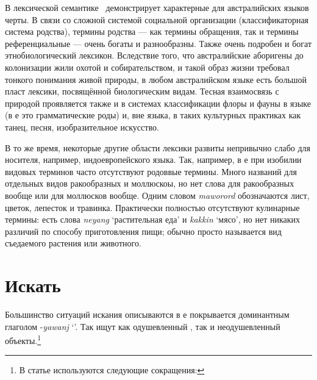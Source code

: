 
В лексической семантике \ демонстрирует характерные для австралийских языков черты. В связи со сложной системой социальной организации (классификаторная система родства), %
термины родства --- как термины обращения, так и термины референциальные --- %
очень богаты и разнообразны. Также очень подробен и богат этнобиологический лексикон. Вследствие того, что австралийские аборигены до колонизации жили охотой и собирательством, и такой образ жизни требовал тонкого понимания живой природы, в любом австралийском языке есть большой пласт лексики, посвящённой биологическим видам. Тесная взаимосвязь с природой проявляется также и в системах классификации флоры и фауны в языке (в  е это грамматические роды) и, вне языка, в таких культурных практиках как танец, песня, изобразительное искусство.

В то же время, некоторые другие области лексики развиты непривычно слабо для носителя, например, индоевропейского языка. Так, например, в  е при изобилии видовых терминов часто отсутствуют родоввые термины. Много названий для отдельных видов ракообразных и моллюскоы, но нет слова для ракообразных вообще или для моллюсков вообще. Одним словом \textit{maworord} обозначаются лист, цветок, лепесток и травинка. Практически полностью отсутствуют кулинарные термины: есть слова \textit{neyang} `растительная еда' и \textit{kakkin} `мясо', но нет никаких различий по способу приготовления пищи; обычно просто называется вид съедаемого растения или животного.


\section{Искать}
Большинство ситуаций искания описываются в  е покрывается доминантным глаголом -\textit{yawanj} `\yaw'. Так ищут как одушевленный , так и неодушевленный  объекты.\footnote{В статье используются следующие сокращения: \printglossary[style=inline,type=\leipzigtype]}

